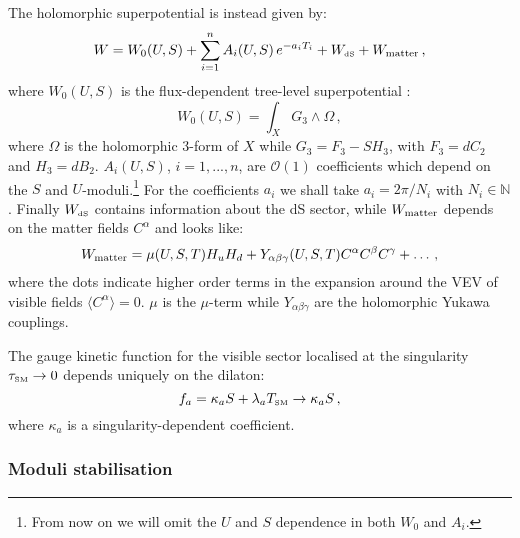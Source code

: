 \documentclass[11pt,a4paper]{article}
\newcommand{\be}{\begin{equation}}
\newcommand{\ee}{\end{equation}}
\def\SM{{\scriptscriptstyle \rm SM}}
\def\dS{{\scriptscriptstyle \rm dS}}
\newcommand{\mc}{\mathcal}
\begin{document}
The holomorphic superpotential is instead given by:
\be
\label{eq:superpotential}
W = W_0(U,S) + \sum_{i=1}^n A_i(U,S)\, e^{-a_i T_i} + W_\dS + W_{\rm matter}\,,
\ee
where $W_0(U,S)$ is the flux-dependent tree-level superpotential \cite{Gukov:1999ya}:
\be
W_0(U,S) = \int_X G_3 \wedge \Omega\,,
\ee
where $\Omega$ is the holomorphic 3-form of $X$ while $G_3 = F_3 - S H_3$, with $F_3 = dC_2$ and $H_3 = dB_2$. $A_i(U,S)$, $i=1,...,n$, are $\mc{O}(1)$ coefficients which depend on the $S$ and $U$-moduli.\footnote{From now on we will omit the $U$ and $S$ dependence in both $W_0$ and $A_i$.} For the coefficients $a_i$ we shall take $a_i = 2 \pi/N_i$ with $N_i \in \mathbb{N}$. Finally $W_\dS$ contains information about the dS sector, while $W_{\rm matter}$ depends on the matter fields $C^\alpha$ and looks like:
\be
\label{eq:wmatter}
W_{\rm matter} = \mu(U,S,T) H_u H_d + Y_{\alpha \beta \gamma}(U,S,T) C^\alpha C^\beta C^\gamma + \dots\,,
\ee
where the dots indicate higher order terms in the expansion around the VEV of visible fields $\langle C^\alpha \rangle = 0$. $\mu$ is the $\mu$-term while $Y_{\alpha \beta \gamma}$ are the holomorphic Yukawa couplings. 

The gauge kinetic function for the visible sector localised at the singularity $\tau_\SM \rightarrow 0$ depends uniquely on the dilaton:
\be
f_a = \kappa_a S + \lambda_a T_\SM \rightarrow \kappa_a S \,,
\ee
where $\kappa_a$ is a singularity-dependent coefficient. 

\subsubsection{Moduli stabilisation}
\label{ssec:modulistabilisation}
\end{document}
